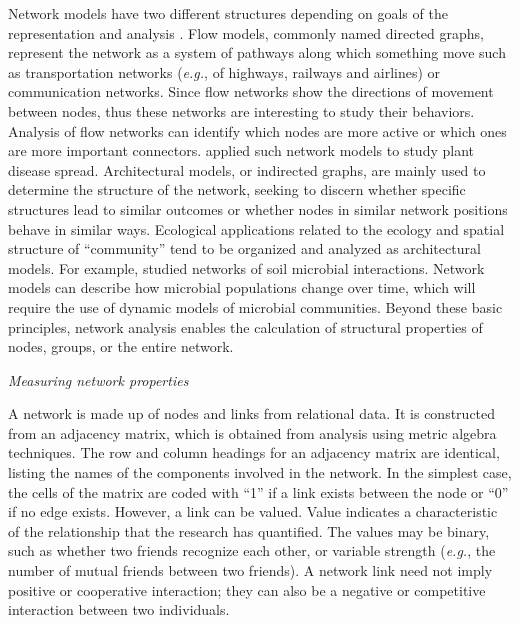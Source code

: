 \documentclass[12pt, oneside]{report}
\begin{document}
Network models have two different structures depending on goals of the representation and analysis \citep{borgatti2013analyzing}. Flow models, commonly named directed graphs, represent the network as a system of pathways along which something move such as transportation networks (\textit{e.g.}, of highways, railways and airlines) or communication networks. Since flow networks show the directions of movement between nodes, thus these networks are interesting to study their behaviors. Analysis of flow networks can identify which nodes are more active or which ones are more important connectors. \citet{Jeger:2007tn, Shaw:2014cka} applied such network models to study plant disease spread. Architectural models, or indirected graphs, are mainly used to determine the structure of the network, seeking to discern whether specific structures lead to similar outcomes or whether nodes in similar network positions behave in similar ways. Ecological applications related to the ecology and spatial structure of ``community'' tend to be organized and analyzed as architectural models. For example, \citet{Faust:2012dk} studied networks of soil microbial interactions. Network models can describe how microbial populations change over time, which will require the use of dynamic models of microbial communities. Beyond these basic principles, network analysis enables the calculation of structural properties of nodes, groups, or the entire network.

\textit{Measuring network properties}

A network is made up of nodes and links from relational data. It is constructed from an adjacency matrix, which is obtained from analysis using metric algebra techniques. The row and column headings for an adjacency matrix are identical, listing the names of the components involved in the network. In the simplest case, the cells of the matrix are coded with ``1'' if a link exists between the node or ``0'' if no edge exists. However, a link can be valued. Value indicates a characteristic of the relationship that the research has quantified. The values may be binary, such as whether two friends recognize each other, or variable strength (\textit{e.g.}, the number of mutual friends between two friends). A network link need not imply positive or cooperative interaction; they can also be a negative or competitive interaction between two individuals. 
\end{document}
